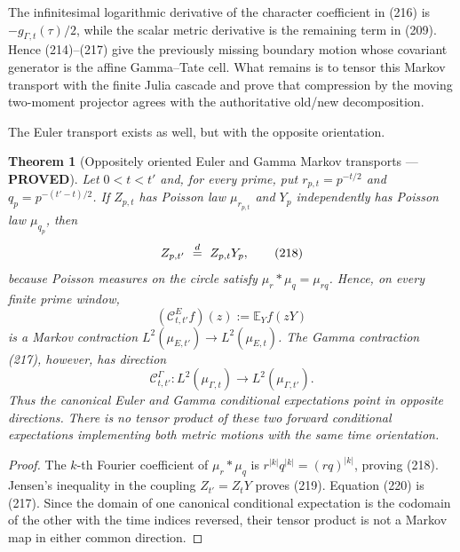 \documentclass[11pt]{article}
\newtheorem{theorem}{Theorem}
\newcommand{\PROVED}{\textcolor{green!45!black}{\textbf{PROVED}}}
\begin{document}
The infinitesimal logarithmic derivative of the character coefficient in
(216) is $-g_{\Gamma,t}(\tau)/2$, while the scalar metric derivative is the
remaining term in (209).  Hence (214)--(217) give the previously missing
boundary motion whose covariant generator is the affine Gamma--Tate cell.
What remains is to tensor this Markov transport with the finite Julia cascade
and prove that compression by the moving two-moment projector agrees with the
authoritative old/new decomposition.

The Euler transport exists as well, but with the opposite orientation.

\begin{theorem}[Oppositely oriented Euler and Gamma Markov transports
--- \PROVED]
Let $0<t<t'$ and, for every prime, put
$r_{p,t}=p^{-t/2}$ and $q_p=p^{-(t'-t)/2}$.  If
$Z_{p,t}$ has Poisson law $\mu_{r_{p,t}}$ and $Y_p$ independently has
Poisson law $\mu_{q_p}$, then
\begin{equation}
 Z_{p,t'}\ \buildrel d\over=\ Z_{p,t}Y_p,             \tag{218}
\end{equation}
because Poisson measures on the circle satisfy
$\mu_r*\mu_q=\mu_{rq}$.  Hence, on every finite prime window,
\begin{equation}
 (\mathcal C^E_{t,t'}f)(z)
 :=\mathbb E_Y f(zY)                                  \tag{219}
\end{equation}
is a Markov contraction
$L^2(\mu_{E,t'})\to L^2(\mu_{E,t})$.
The Gamma contraction (217), however, has direction
\begin{equation}
 \mathcal C^\Gamma_{t,t'}:
 L^2(\mu_{\Gamma,t})\longrightarrow
 L^2(\mu_{\Gamma,t'}).                               \tag{220}
\end{equation}
Thus the canonical Euler and Gamma conditional expectations point in
opposite directions.  There is no tensor product of these two
\emph{forward} conditional expectations implementing both metric motions
with the same time orientation.
\end{theorem}

\begin{proof}
The $k$-th Fourier coefficient of $\mu_r*\mu_q$ is
$r^{|k|}q^{|k|}=(rq)^{|k|}$, proving (218).  Jensen's inequality in the
coupling $Z_{t'}=Z_tY$ proves (219).  Equation (220) is (217).  Since the
domain of one canonical conditional expectation is the codomain of the other
with the time indices reversed, their tensor product is not a Markov map in
either common direction.
\end{proof}
\end{document}
